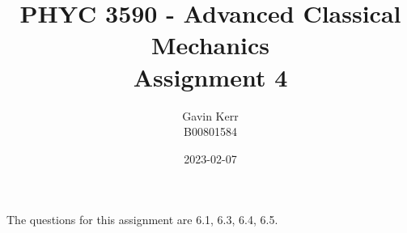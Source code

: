 \documentclass[12pt, a4paper]{article}
\title{PHYC 3590 - Advanced Classical Mechanics\\Assignment 4}
\author{Gavin Kerr\\B00801584}
\date{2023-02-07}
\begin{document}
\maketitle
The questions for this assignment are 6.1, 6.3, 6.4, 6.5.
\end{document}
